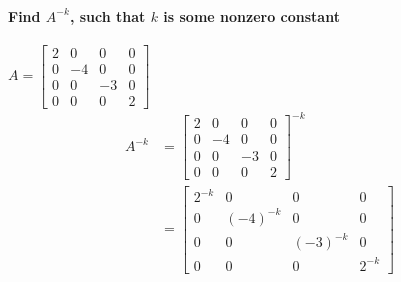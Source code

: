 \documentclass[
  letterpaper,
  DIV=11,
  numbers=noendperiod]{scrartcl}
\let\oldparagraph\paragraph
\renewcommand{\paragraph}[1]{\oldparagraph{#1}\mbox{}}
\begin{document}
\newpage{}

\paragraph{\texorpdfstring{Find \(A^{-k}\), such that \(k\) is some
nonzero
constant}{Find A\^{}\{-k\}, such that k is some nonzero constant}}\label{find-a-k-such-that-k-is-some-nonzero-constant}

\(A=\begin{bmatrix}2 & 0 & 0 & 0 \\ 0 & -4 & 0 & 0 \\ 0 & 0 & -3 & 0 \\ 0 & 0 & 0 & 2 \end{bmatrix}\)
\begin{align*}
A^{-k} &= \begin{bmatrix}2 & 0 & 0 & 0 \\ 0 & -4 & 0 & 0 \\ 0 & 0 & -3 & 0 \\ 0 & 0 & 0 & 2 \end{bmatrix}^{-k} \\
&= \begin{bmatrix}2^{-k} & 0 & 0 & 0 \\ 0 & (-4)^{-k} & 0 & 0 \\ 0 & 0 & (-3)^{-k} & 0 \\ 0 & 0 & 0 & 2^{-k} \end{bmatrix}
\end{align*}
\end{document}
